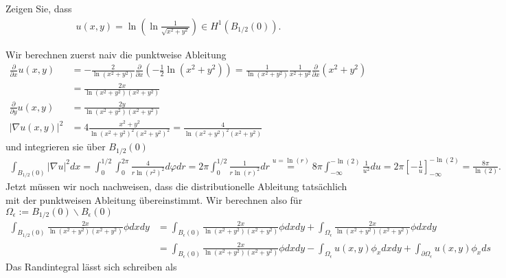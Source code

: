 
\begin{exercise}

  Zeigen Sie, dass
  \begin{align*}
      u(x, y) = \ln\left(\ln \frac{1}{\sqrt{x^2 + y^2}}\right) \in H^1(B_{1/2}(0)).
  \end{align*}

\end{exercise}


\begin{solution}
Wir berechnen zuerst naiv die punktweise Ableitung
\begin{align*}
  \frac{\partial}{\partial x} u(x,y) &= -\frac{2}{\ln(x^2+y^2)}
  \frac{\partial}{\partial x}(-\frac{1}{2}\ln(x^2+y^2)) =
  \frac{1}{\ln(x^2+y^2)}\frac{1}{x^2+y^2}\frac{\partial}{\partial x}(x^2+y^2) \\
  &= \frac{2x}{\ln(x^2+y^2)(x^2+y^2)} \\
  \frac{\partial}{\partial y} u(x,y) &= \frac{2y}{\ln(x^2+y^2)(x^2+y^2)} \\
  |\nabla u(x,y)|^2 &= 4\frac{x^2+y^2}{\ln(x^2+y^2)^2(x^2+y^2)^2} = \frac{4}{\ln(x^2+y^2)^2(x^2+y^2)}
\end{align*}
und integrieren sie über $B_{1/2}(0)$
\begin{align*}
  \int_{B_{1/2}(0)}|\nabla u|^2 dx = \int_0^{1/2}\int_0^{2\pi}\frac{4}{r\ln(r^2)^2} d\varphi dr
= 2\pi\int_0^{1/2}\frac{1}{r\ln(r)^2} dr
\stackrel{u = \ln(r)}{=} 8\pi \int_{-\infty}^{-\ln(2)} \frac{1}{u^2} du
  = 2\pi[-\frac{1}{u}]_{-\infty}^{-\ln(2)} = \frac{8\pi}{\ln(2)}.
\end{align*}
Jetzt müssen wir noch nachweisen, dass die distributionelle Ableitung
tatsächlich mit der punktweisen Ableitung übereinstimmt.
Wir berechnen also für $\Omega_\epsilon := B_{1/2}(0)\backslash B_\epsilon(0)$
\begin{align*}
  \int_{B_{1/2}(0)}\frac{2x}{\ln(x^2+y^2)(x^2+y^2)}\phi dxdy &=
  \int_{B_\epsilon(0)}\frac{2x}{\ln(x^2+y^2)(x^2+y^2)}\phi dxdy
  + \int_{\Omega_\epsilon}\frac{2x}{\ln(x^2+y^2)(x^2+y^2)}\phi dxdy \\
  &= \int_{B_\epsilon(0)}\frac{2x}{\ln(x^2+y^2)(x^2+y^2)}\phi dxdy
  - \int_{\Omega_\epsilon}u(x,y)\phi_x dxdy +
  \int_{\partial \Omega_\epsilon}u(x,y)\phi_x ds
\end{align*}
Das Randintegral lässt sich schreiben  als

\end{solution}
